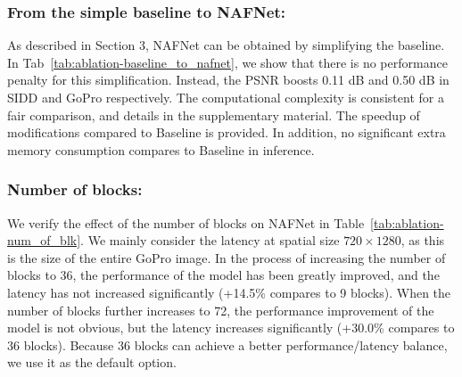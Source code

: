 \documentclass[runningheads]{llncs}
\begin{document}
\subsubsection{From the simple baseline to NAFNet:} As described in Section 3, NAFNet can be obtained by simplifying the baseline. 
In Tab~\ref{tab:ablation-baseline_to_nafnet}, we show that there is no performance penalty for this simplification. Instead, the PSNR boosts 0.11 dB and 0.50 dB in SIDD and GoPro respectively.
The computational complexity is consistent for a fair comparison, and details in the supplementary material.  The speedup of modifications compared to Baseline is provided. In addition, no significant extra memory consumption compares to Baseline in inference.


\subsubsection{Number of blocks:} 
We verify the effect of the number of blocks on NAFNet in Table~\ref{tab:ablation-num_of_blk}. We mainly consider the latency at spatial size $720\times1280$, as this is the size of the entire GoPro image.
In the process of increasing the number of blocks to 36, the performance of the model has been greatly improved, and the latency has not increased significantly (+14.5\% compares to 9 blocks). When the number of blocks further increases to 72, the performance improvement of the model is not obvious, but the latency increases significantly (+30.0\% compares to 36 blocks). Because 36 blocks can achieve a better performance/latency balance, we use it as the default option.
\end{document}
